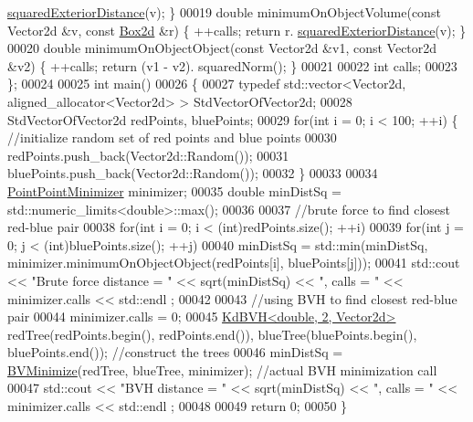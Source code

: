 \begin{DoxyCode}
      \hyperlink{group___geometry___module_aa6d9ffc81bd77da631fef6559f45cf13}{squaredExteriorDistance}(v); \}
00019   \textcolor{keywordtype}{double} minimumOnObjectVolume(\textcolor{keyword}{const} Vector2d &v, \textcolor{keyword}{const} \hyperlink{group___geometry___module_class_eigen_1_1_aligned_box}{Box2d} &r) \{ ++calls; \textcolor{keywordflow}{return} r.
      \hyperlink{group___geometry___module_aa6d9ffc81bd77da631fef6559f45cf13}{squaredExteriorDistance}(v); \}
00020   \textcolor{keywordtype}{double} minimumOnObjectObject(\textcolor{keyword}{const} Vector2d &v1, \textcolor{keyword}{const} Vector2d &v2) \{ ++calls; \textcolor{keywordflow}{return} (v1 - v2).
      squaredNorm(); \}
00021 
00022   \textcolor{keywordtype}{int} calls;
00023 \};
00024 
00025 \textcolor{keywordtype}{int} main()
00026 \{
00027   \textcolor{keyword}{typedef} std::vector<Vector2d, aligned\_allocator<Vector2d> > StdVectorOfVector2d;
00028   StdVectorOfVector2d redPoints, bluePoints;
00029   \textcolor{keywordflow}{for}(\textcolor{keywordtype}{int} i = 0; i < 100; ++i) \{ \textcolor{comment}{//initialize random set of red points and blue points}
00030     redPoints.push\_back(Vector2d::Random());
00031     bluePoints.push\_back(Vector2d::Random());
00032   \}
00033 
00034   \hyperlink{struct_point_point_minimizer}{PointPointMinimizer} minimizer;
00035   \textcolor{keywordtype}{double} minDistSq = std::numeric\_limits<double>::max();
00036 
00037   \textcolor{comment}{//brute force to find closest red-blue pair}
00038   \textcolor{keywordflow}{for}(\textcolor{keywordtype}{int} i = 0; i < (int)redPoints.size(); ++i)
00039     \textcolor{keywordflow}{for}(\textcolor{keywordtype}{int} j = 0; j < (int)bluePoints.size(); ++j)
00040       minDistSq = std::min(minDistSq, minimizer.minimumOnObjectObject(redPoints[i], bluePoints[j]));
00041   std::cout << \textcolor{stringliteral}{"Brute force distance = "} << sqrt(minDistSq) << \textcolor{stringliteral}{", calls = "} << minimizer.calls << std::endl
      ;
00042 
00043   \textcolor{comment}{//using BVH to find closest red-blue pair}
00044   minimizer.calls = 0;
00045   \hyperlink{class_eigen_1_1_kd_b_v_h}{KdBVH<double, 2, Vector2d>} redTree(redPoints.begin(), redPoints.end()), 
      blueTree(bluePoints.begin(), bluePoints.end()); \textcolor{comment}{//construct the trees}
00046   minDistSq = \hyperlink{namespace_eigen_adcbe73ac1482eacab0e18ee32c25508e}{BVMinimize}(redTree, blueTree, minimizer); \textcolor{comment}{//actual BVH minimization call}
00047   std::cout << \textcolor{stringliteral}{"BVH distance         = "} << sqrt(minDistSq) << \textcolor{stringliteral}{", calls = "} << minimizer.calls << std::endl
      ;
00048 
00049   \textcolor{keywordflow}{return} 0;
00050 \}
\end{DoxyCode}

